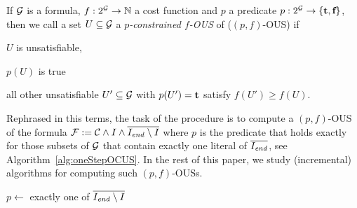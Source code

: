 \begin{definition}
    If $\mathcal{G} $ is a formula, $f:2^{\mathcal{G} } \to \mathbb{N}$ a cost function and  $p$ a predicate $p: 2^{\mathcal{G} }\to \{\textbf{t},\textbf{f}\}$, then we call a set $U\subseteq \mathcal{G} $ a \emph{$p$-constrained $f$-OUS} of \formulag ($(p,f)$-OUS)   if \begin{compactitem}                                                                                                                                                                                                                         
    \item $U$ is unsatisfiable,
    \item $p(U)$ is true
    \item all other unsatisfiable $U'\subseteq \mathcal{G} $ with $p(U')=\textbf{t}$ satisfy $f(U')\geq f(U)$.                                                                                                                                                                                                                         \end{compactitem}
\end{definition}

Rephrased in this terms, the task of the procedure \onestep is to compute a $(p,f)$-OUS of the formula $\mathcal{F}  := \mathcal{C} \land I\land \overline{I_\mathit{end} \setminus I}$ where $p$ is the predicate that holds exactly for those subsets of $\mathcal{G} $ that contain exactly one literal of $\overline{I_\mathit{end} }$, see Algorithm~\eqref{alg:oneStepOCUS}. 
In the rest of this paper, we study (incremental) algorithms for computing such $(p,f)$-OUSs. 

\newcommand\onestepo{\ensuremath{\call{explain-One-Step-OCUS}}\xspace}
\begin{algorithm}[t]
  \DontPrintSemicolon
  
  \caption{$\onestepo(\formulac,f,I,\Iend)$}
  \label{alg:oneStepOCUS}
  $p \leftarrow$ exactly one of $\overline{I_\mathit{end} \setminus I}$\;
\end{algorithm}



